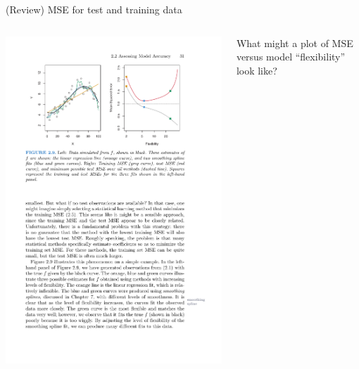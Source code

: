 \documentclass[aspectratio=169]{beamer}
\begin{document}
\begin{frame}{(Review) MSE for test and training data}


\begin{columns}


\includegraphics[scale=1]{figures/islr2_9a.pdf}


What might a plot of MSE versus model ``flexibility'' look like?




\end{columns}
\end{frame}
\end{document}
